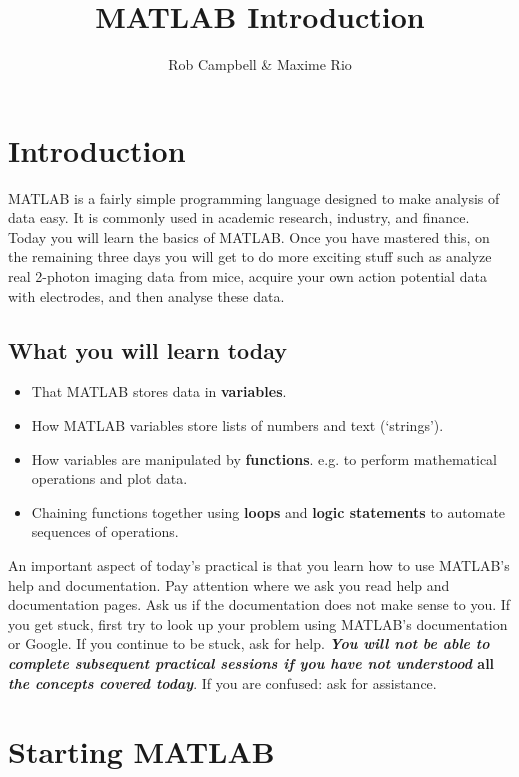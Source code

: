 \documentclass{article}
\title{MATLAB Introduction}
\author{Rob Campbell \& Maxime Rio}
\date{}
\begin{document}
\maketitle


\section*{Introduction}

MATLAB is a fairly simple programming language designed to make analysis of data easy.
It is commonly used in academic research, industry, and finance.
Today you will learn the basics of MATLAB.
Once you have mastered this, on the remaining three days you will get to do more exciting stuff such as analyze real 2-photon imaging data from mice, acquire your own action potential data with electrodes, and then analyse these data.


\subsection*{What you will learn today}

\begin{itemize}
\item That MATLAB stores data in \textbf{variables}.
\item How MATLAB variables store lists of numbers and text (`strings').
\item How variables are manipulated by \textbf{functions}. e.g. to perform mathematical operations and plot data.
\item Chaining functions together using \textbf{loops} and \textbf{logic statements} to automate sequences of operations.
\end{itemize}

An important aspect of today's practical is that you learn how to use MATLAB's help and documentation.
Pay attention where we ask you read help and documentation pages. Ask us if the documentation does not make sense to you.
If you get stuck, first try to look up your problem using MATLAB's documentation or Google.
If you continue to be stuck, ask for help.
\textbf{\emph{You will not be able to complete subsequent practical sessions if you have not understood} all \emph{the concepts covered today}}.
If you are confused: ask for assistance.


\pagebreak
\section{Starting MATLAB}
\end{document}
